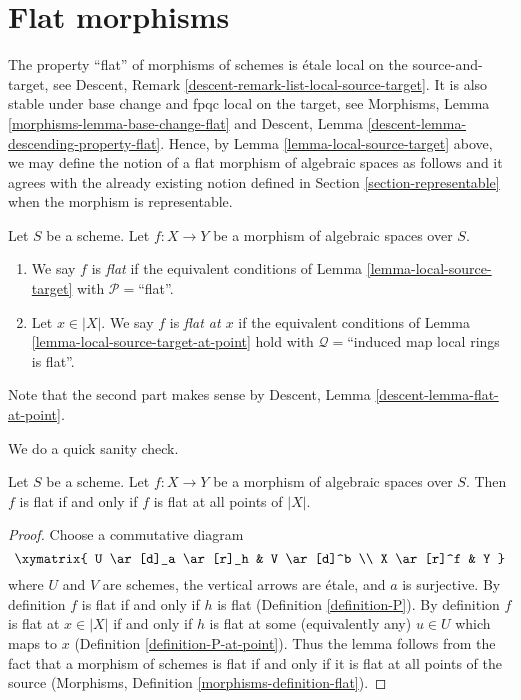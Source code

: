 \section{Flat morphisms}
\label{section-flat}

\noindent
The property ``flat'' of morphisms of schemes is
\'etale local on the source-and-target, see
Descent, Remark \ref{descent-remark-list-local-source-target}.
It is also stable under base change and fpqc local on the target, see
Morphisms, Lemma \ref{morphisms-lemma-base-change-flat} and
Descent, Lemma \ref{descent-lemma-descending-property-flat}.
Hence, by
Lemma \ref{lemma-local-source-target}
above, we may define the notion of a flat morphism of algebraic spaces as
follows and it agrees with the already existing notion defined in
Section \ref{section-representable}
when the morphism is representable.

\begin{definition}
\label{definition-flat}
Let $S$ be a scheme.
Let $f : X \to Y$ be a morphism of algebraic spaces over $S$.
\begin{enumerate}
\item We say $f$ is {\it flat} if the equivalent conditions of
Lemma \ref{lemma-local-source-target} with
$\mathcal{P} =$``flat''.
\item Let $x \in |X|$. We say $f$ is {\it flat at $x$} if the
equivalent conditions of
Lemma \ref{lemma-local-source-target-at-point}
hold with $\mathcal{Q} =$``induced map local rings is flat''.
\end{enumerate}
Note that the second part makes sense by
Descent, Lemma \ref{descent-lemma-flat-at-point}.
\end{definition}

\noindent
We do a quick sanity check.

\begin{lemma}
\label{lemma-flat-is-flat-at-all-points}
Let $S$ be a scheme. Let $f : X \to Y$ be a morphism of algebraic spaces
over $S$. Then $f$ is flat if and only if $f$ is flat at all points of $|X|$.
\end{lemma}

\begin{proof}
Choose a commutative diagram
$$
\xymatrix{
U \ar[d]_a \ar[r]_h & V \ar[d]^b \\
X \ar[r]^f & Y
}
$$
where $U$ and $V$ are schemes, the vertical arrows are \'etale, and
$a$ is surjective. By definition $f$ is flat if and only if $h$ is flat
(Definition \ref{definition-P}).
By definition $f$ is flat at $x \in |X|$ if and only if $h$ is flat
at some (equivalently any) $u \in U$ which maps to $x$
(Definition \ref{definition-P-at-point}).
Thus the lemma follows from the fact that a morphism of schemes
is flat if and only if it is flat at all points of the source
(Morphisms, Definition \ref{morphisms-definition-flat}).
\end{proof}

